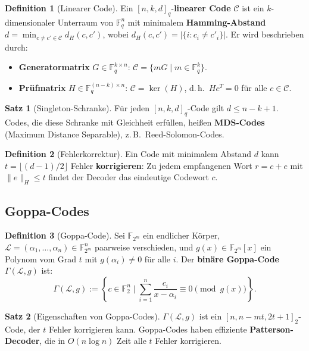 ﻿\documentclass[a4paper,12pt]{scrreprt}
\theoremstyle{definition}
\newtheorem{definition}{Definition}[section]
\newtheorem{satz}{Satz}[section]
\begin{document}
\begin{definition}[Linearer Code]
Ein $[n, k, d]_q$-\textbf{linearer Code} $\mathcal{C}$ ist ein $k$-dimensionaler Unterraum von $\mathbb{F}_q^n$ mit minimalem \textbf{Hamming-Abstand} $d = \min_{c \neq c' \in \mathcal{C}} d_H(c, c')$, wobei $d_H(c, c') = |\{i : c_i \neq c'_i\}|$. Er wird beschrieben durch:
\begin{itemize}
    \item \textbf{Generatormatrix} $G \in \mathbb{F}_q^{k \times n}$: $\mathcal{C} = \{mG \mid m \in \mathbb{F}_q^k\}$.
    \item \textbf{Prüfmatrix} $H \in \mathbb{F}_q^{(n-k) \times n}$: $\mathcal{C} = \ker(H)$, d.\,h.\ $Hc^T = 0$ für alle $c \in \mathcal{C}$.
\end{itemize}
\end{definition}

\begin{satz}[Singleton-Schranke]
Für jeden $[n,k,d]_q$-Code gilt $d \leq n - k + 1$. Codes, die diese Schranke mit Gleichheit erfüllen, heißen \textbf{MDS-Codes} (Maximum Distance Separable), z.\,B.\ Reed-Solomon-Codes.
\end{satz}

\begin{definition}[Fehlerkorrektur]
Ein Code mit minimalem Abstand $d$ kann $t = \lfloor(d-1)/2\rfloor$ Fehler \textbf{korrigieren}: Zu jedem empfangenen Wort $r = c + e$ mit $\|e\|_H \leq t$ findet der Decoder das eindeutige Codewort $c$.
\end{definition}

\subsection{Goppa-Codes}

\begin{definition}[Goppa-Code]
Sei $\mathbb{F}_{2^m}$ ein endlicher Körper, $\mathcal{L} = (\alpha_1,\ldots,\alpha_n) \in \mathbb{F}_{2^m}^n$ paarweise verschieden, und $g(x) \in \mathbb{F}_{2^m}[x]$ ein Polynom vom Grad $t$ mit $g(\alpha_i) \neq 0$ für alle $i$. Der \textbf{binäre Goppa-Code} $\Gamma(\mathcal{L}, g)$ ist:
\[
\Gamma(\mathcal{L}, g) := \left\{ c \in \mathbb{F}_2^n \;\Big|\; \sum_{i=1}^n \frac{c_i}{x - \alpha_i} \equiv 0 \pmod{g(x)} \right\}.
\]
\end{definition}

\begin{satz}[Eigenschaften von Goppa-Codes]
$\Gamma(\mathcal{L}, g)$ ist ein $[n, n-mt, 2t+1]_2$-Code, der $t$ Fehler korrigieren kann. Goppa-Codes haben effiziente \textbf{Patterson-Decoder}, die in $O(n \log n)$ Zeit alle $t$ Fehler korrigieren.
\end{satz}
\end{document}
